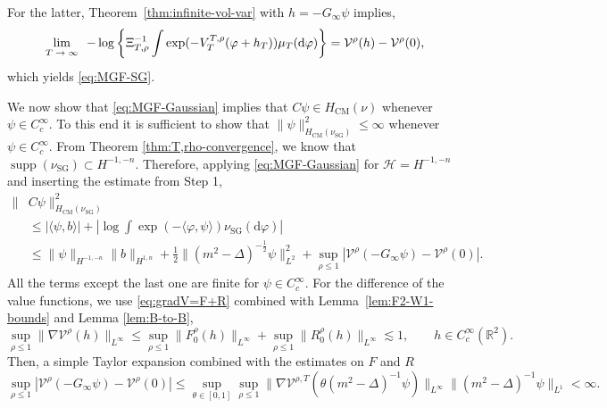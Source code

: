 \documentclass[11pt, a4paper]{scrartcl}
\numberwithin{equation}{section}
\theoremstyle{plain}
\theoremstyle{remark}
\newcommand{\mathd}{\mathrm{d}}
\newcommand{\tmop}[1]{\ensuremath{\operatorname{#1}}}
\newcommand{\tmscript}[1]{\text{\scriptsize{$#1$}}}
\newcommand{\tmtextbf}[1]{\text{{\bfseries{#1}}}}
\begin{document}
For the latter, Theorem~\ref{thm:infinite-vol-var} with $h=-G_\infty\psi$ implies,
\[ \lim_{\tmscript{\begin{array}{c}
				T \rightarrow \infty
			\end{array}}} - \log \left\{ \Xi_{T, \rho}^{- 1} \int \exp (- V_T^{T, \rho}
	(\varphi + h_T)) \mu_T (\mathd \varphi) \right\} =
	\mathcal{V}^{\rho} (h) - \mathcal{V}^{\rho} (0), \]
which yields \eqref{eq:MGF-SG}.

\tmtextbf{Step 2.}
We now show that \eqref{eq:MGF-Gaussian} implies that $C\psi\in H_{\tmop{CM}}(\nu)$
whenever $\psi\in C_c^\infty$.
To this end it is sufficient to show that $\|\psi\|_{H_{\tmop{CM}}(\nu_{\tmop{SG}})}
	^2\leqslant\infty$ whenever $\psi\in C^\infty_c$.
From Theorem \ref{thm:T,rho-convergence}, we know that $\tmop{supp}(\nu_{\tmop{SG}})
	\subset H^{-1,-n}$. Therefore, applying \eqref{eq:MGF-Gaussian} for
$\mathcal{H}=H^{-1,-n}$ and inserting the estimate from Step 1,
\[
	\begin{aligned}
		\| & C\psi\|_{H_{\tmop{CM}}(\nu_{\tmop{SG}})}^2                                     \\
		   & \leqslant |\langle\psi, b\rangle| + |\log\int\exp(-\langle\varphi,\psi\rangle)
		\nu_{\tmop{SG}}(\mathd\varphi)|                                                     \\
		   & \leqslant \|\psi\|_{H^{-1,-n}}\|b\|_{H^{1,n}}
		+ \frac{1}{2} \|(m^2-\Delta)^{-\frac{1}{2}}\psi\|^2_{L^2}
		+ \sup_{\rho\leqslant 1} |\mathcal{V}^{\rho} (-G_\infty\psi) -
		\mathcal{V}^{\rho} (0)|.
	\end{aligned}
\]
All the terms except the last one are finite for $\psi\in C^\infty_c$.
For the difference of the value functions, we use \eqref{eq:gradV=F+R}
combined with Lemma~\ref{lem:F2-W1-bounds} and Lemma \ref{lem:B-to-B},
\[ \sup_{\rho\leqslant 1}\|\nabla \mathcal{V}^{\rho} (h)\|_{L^\infty} \leqslant
	\sup_{\rho\leqslant 1}\|F_0^{\rho} (h)\|_{L^\infty}
	+ \sup_{\rho\leqslant 1}\|R_0^{\rho} (h)\|_{L^\infty}\lesssim 1, \qquad h
	\in C_{c}^{\infty} (\mathbb{R}^2).
\]
Then, a simple Taylor expansion combined with the estimates on $F$ and $R$
\[
	\sup_{\rho\leqslant 1} |\mathcal{V}^{\rho} (-G_\infty\psi) -
	\mathcal{V}^{\rho} (0)|
	\leqslant
	\sup_{\theta \in [0, 1]}\sup_{\rho\leqslant 1}
	\| \nabla \mathcal{V}^{\rho, T} (\theta (m^2 - \Delta)^{-1} \psi)
	\|_{L^{\infty}} \| (m^2 - \Delta)^{-1} \psi \|_{L^1}<\infty.
\]
\end{document}

